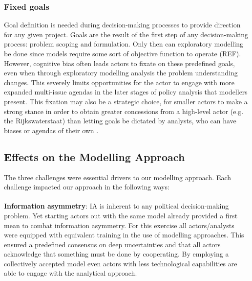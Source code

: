 \subsubsection{Fixed goals}
Goal definition is needed during decision-making processes to provide direction for any given project. Goals are the result of the first step of any decision-making process: problem scoping and formulation. Only then can exploratory modelling be done since models require some sort of objective function to operate (REF). However, cognitive bias often leads actors to fixate on these predefined goals, even when through exploratory modelling analysis the problem understanding changes. This severely limits opportunities for the actor to engage with more expanded multi-issue agendas in the later stages of policy analysis that modellers present. This fixation may also be a strategic choice, for smaller actors to make a strong stance in order to obtain greater concessions from a high-level actor (e.g. the Rijkswaterstaat) than letting goals be dictated by analysts, who can have biases or agendas of their own \parencite{hans_de_bruijn_mark_de_bruijne_ernst_ten_heuvelhof_politics_2015}. 

\subsection{Effects on the Modelling Approach}

The three challenges were essential drivers to our modelling approach. Each challenge impacted our approach in the following ways: \\
\\
\textbf{Information asymmetry}: IA is inherent to any political decision-making problem. Yet starting actors out with the same model already provided a first mean to combat information asymmetry. For this exercise all actors/analysts were equipped with equivalent training in the use of modelling approaches. This ensured a predefined consensus on deep uncertainties and that all actors acknowledge that something must be done by cooperating. By employing a collectively accepted model even actors with less technological capabilities are able to engage with the analytical approach.

